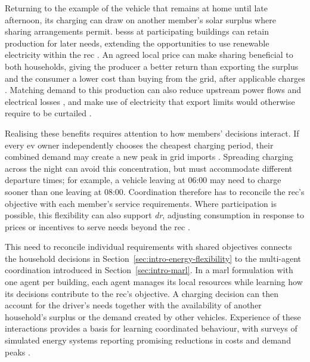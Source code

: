 Returning to the example of the vehicle that remains at home until late afternoon, its charging can draw on another member's solar surplus where sharing arrangements permit. \glspl{bess} at participating buildings can retain production for later needs, extending the opportunities to use renewable electricity within the \gls{rec} \parencite{faia2023energycommunity,srithapon2023predictive}. An agreed local price can make sharing beneficial to both households, giving the producer a better return than exporting the surplus and the consumer a lower cost than buying from the grid, after applicable charges \parencite{moret2019energycollectives,portugal2022electricity}. Matching demand to this production can also reduce upstream power flows and electrical losses \parencite{pohl2024distribution}, and make use of electricity that export limits would otherwise require to be curtailed \parencite{hodge2017charging}.

Realising these benefits requires attention to how members' decisions interact. If every \gls{ev} owner independently chooses the cheapest charging period, their combined demand may create a new peak in grid imports \parencite{hodge2017charging}. Spreading charging across the night can avoid this concentration, but must accommodate different departure times; for example, a vehicle leaving at 06:00 may need to charge sooner than one leaving at 08:00. Coordination therefore has to reconcile the \gls{rec}'s objective with each member's service requirements. Where participation is possible, this flexibility can also support \emph{\gls{dr}}, adjusting consumption in response to prices or incentives to serve needs beyond the \gls{rec} \parencite{eu2019electricity,erse2024firme}.

This need to reconcile individual requirements with shared objectives connects the household decisions in Section~\ref{sec:intro-energy-flexibility} to the multi-agent coordination introduced in Section~\ref{sec:intro-marl}. In a \gls{marl} formulation with one agent per building, each agent manages its local resources while learning how its decisions contribute to the \gls{rec}'s objective. A charging decision can then account for the driver's needs together with the availability of another household's surplus or the demand created by other vehicles. Experience of these interactions provides a basis for learning coordinated behaviour, with surveys of simulated energy systems reporting promising reductions in costs and demand peaks \parencite{keren2024energynetworks,sajid2026marldrreview}.

